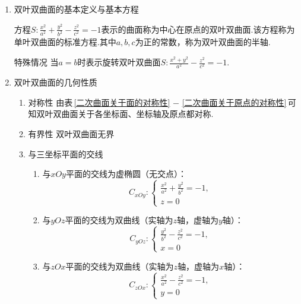 \begin{enumerate}
		\item 双叶双曲面的基本定义与基本方程
	\vspace*{0.5em}
	
	\enbelowdefination[双叶双曲面]
	\kg 方程$\displaystyle S:\frac{x^2}{a^2}+\frac{y^2}{b^2}-\frac{z^2}{c^2}=-1$表示的曲面称为中心在原点的{\color{dy}双叶双曲面}.该方程称为{\color{dy}单叶双曲面的标准方程}.其中$a,b,c$为正的常数，称为双叶双曲面的{\color{dy}半轴}.
	\par {\color{dy}特殊情况}
	\kg 当$a=b$时表示{\color{dy}旋转双叶双曲面}\label{旋转双叶双曲面}$\displaystyle S:\frac{x^2+y^2}{a^2}-\frac{z^2}{c^2}=-1.$
	
	\item 双叶双曲面的几何性质
	\sja
	\begin{enumerate}
		\setlength{\topsep}{0.01em}
		\setlength{\itemsep}{0.01em}
		
		\item 对称性 
		\kg 由表$\,$\ref{二次曲面关于面的对称性}  $-$ \ref{二次曲面关于原点的对称性}$\,$可知双叶双曲面关于各坐标面、坐标轴及原点都对称.
		
		\item 有界性 \kg  双叶双曲面无界
		
		\item 与三坐标平面的交线
		
		\begin{enumerate}
	\setlength{\topsep}{0.01em}
	\setlength{\itemsep}{0.01em}
	\item 与$xOy$平面的交线为虚椭圆（无交点）：
	\begin{equation}
	C_{xOy}:
	\begin{cases}
	\displaystyle \frac{x^2}{a^2}+\frac{y^2}{b^2}=-1,\\
	z=0
	\end{cases}
	\label{S2.1}
	\end{equation}
	
	\item 与$yOz$平面的交线为双曲线（实轴为$z$轴，虚轴为$y$轴）：
	\begin{equation}
	C_{yOz}:
	\begin{cases}
	\displaystyle \frac{y^2}{b^2}-\frac{z^2}{c^2}=-1,\\
	x=0
	\end{cases}
	\label{S2.2}
	\end{equation}
	
	\item 与$zOx$平面的交线为双曲线（实轴为$z$轴，虚轴为$x$轴）：
	\begin{equation}
	C_{zOx}:
	\begin{cases}
	\displaystyle \frac{x^2}{a^2}-\frac{z^2}{c^2}=-1,\\
	y=0
	\end{cases}
	\label{S2.3}
	\end{equation}
\end{enumerate}


\end{enumerate}
\end{enumerate}
